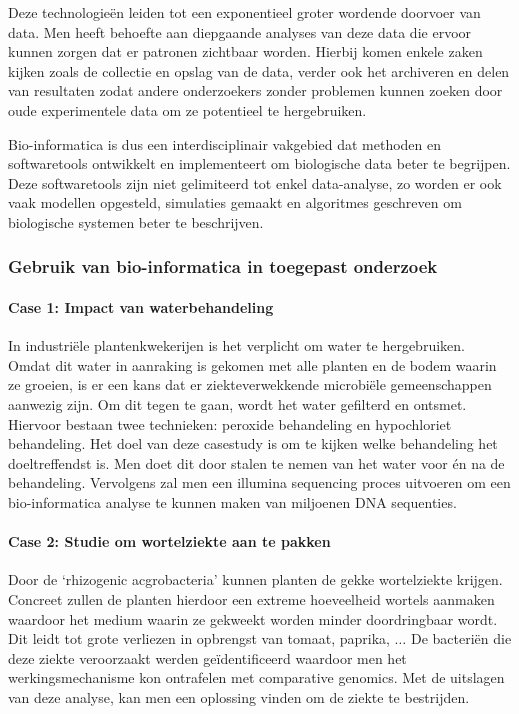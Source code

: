 \documentclass[a4paper,kul]{kulakarticle} %
\begin{document}
Deze technologieën leiden tot een exponentieel groter wordende doorvoer van data. Men heeft behoefte aan diepgaande analyses van deze data die ervoor kunnen zorgen dat er patronen zichtbaar worden. Hierbij komen enkele zaken kijken zoals de collectie en opslag van de data, verder ook het archiveren en delen van resultaten zodat andere onderzoekers zonder problemen kunnen zoeken door oude experimentele data om ze potentieel te hergebruiken. %
\newline

Bio-informatica is dus een interdisciplinair vakgebied dat methoden en softwaretools ontwikkelt en implementeert om biologische data beter te begrijpen. Deze softwaretools zijn niet gelimiteerd tot enkel data-analyse, zo worden er ook vaak modellen opgesteld, simulaties gemaakt en algoritmes geschreven om biologische systemen beter te beschrijven. 
\subsubsection{Gebruik van bio-informatica in toegepast onderzoek}
\paragraph{Case 1: Impact van waterbehandeling}
In industriële plantenkwekerijen is het verplicht om water te hergebruiken. Omdat dit water in aanraking is gekomen met alle planten en de bodem waarin ze groeien, is er een kans dat er ziekteverwekkende microbiële gemeenschappen aanwezig zijn. Om dit tegen te gaan, wordt het water gefilterd en ontsmet. Hiervoor bestaan twee technieken: peroxide behandeling en hypochloriet behandeling. Het doel van deze casestudy is om te kijken welke behandeling het doeltreffendst is. Men doet dit door stalen te nemen van het water voor én na de behandeling. Vervolgens zal men een illumina sequencing proces uitvoeren om een bio-informatica analyse te kunnen maken van miljoenen DNA sequenties.
\paragraph{Case 2: Studie om wortelziekte aan te pakken}
Door de `rhizogenic acgrobacteria' kunnen planten de gekke wortelziekte krijgen. Concreet zullen de planten hierdoor een extreme hoeveelheid wortels aanmaken waardoor het medium waarin ze gekweekt worden minder doordringbaar wordt. Dit leidt tot grote verliezen in opbrengst van tomaat, paprika, $\ldots$ De bacteriën die deze ziekte veroorzaakt werden geïdentificeerd waardoor men het werkingsmechanisme kon ontrafelen met comparative genomics. Met de uitslagen van deze analyse, kan men een oplossing vinden om de ziekte te bestrijden. 
\newpage
\end{document}

